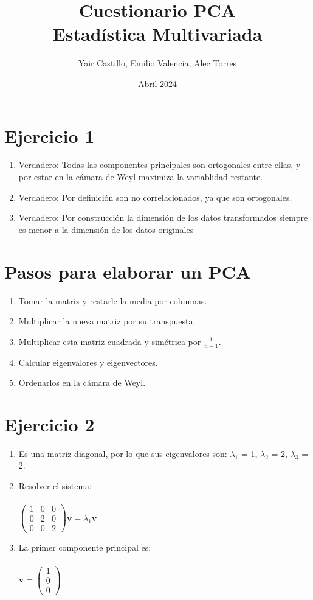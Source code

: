 \documentclass{article}
\title{\textbf{Cuestionario PCA}\\\large{Estadística Multivariada}}
\author{Yair Castillo, Emilio Valencia, Alec Torres}
\date{Abril 2024}
\begin{document}
\maketitle

\section{Ejercicio 1}

\begin{enumerate}
    \item Verdadero: Todas las componentes principales son ortogonales entre ellas, y por estar en la cámara de Weyl maximiza la variablidad restante.
    \item Verdadero: Por definición son no correlacionados, ya que son ortogonales.
    \item Verdadero: Por construcción la dimensión de los datos transformados siempre es menor a la dimensión de los datos originales
\end{enumerate}

\section{Pasos para elaborar un PCA}

\begin{enumerate}
    \item Tomar la matriz y restarle la media por columnas.
    \item Multiplicar la nueva matriz por su transpuesta.
    \item Multiplicar esta matriz cuadrada y simétrica por \( \displaystyle \frac{1}{n-1} \).
    \item Calcular eigenvalores y eigenvectores.
    \item Ordenarlos en la cámara de Weyl.
\end{enumerate}

\section{Ejercicio 2}
\begin{enumerate}
    \item Es una matriz diagonal, por lo que sus eigenvalores son: $\lambda_1$ = 1, $\lambda_2$ = 2, $\lambda_3$ = 2.
    \item Resolver el sistema:\\
    \\$   
\begin{pmatrix}
1 & 0 & 0\\
0 & 2 & 0\\
0 & 0 & 2
\end{pmatrix} \mathbf{v} = \lambda_1 \mathbf{v}$
\item La primer componente principal es:\\
\\$\mathbf{v} = \begin{pmatrix}
1 \\
0 \\
0 
\end{pmatrix}$
\end{enumerate}
\end{document}
